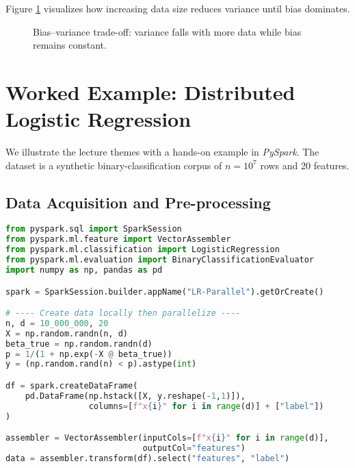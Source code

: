 \documentclass[11pt]{article}
\begin{document}
Figure \ref{fig:biasvariance} visualizes how increasing data size reduces variance until bias dominates.

\begin{figure}[h]
  \centering
  \caption{Bias–variance trade-off: variance falls with more data while bias remains constant.}
  \label{fig:biasvariance}
\end{figure}

\section{Worked Example: Distributed Logistic Regression}

We illustrate the lecture themes with a hands-on example in \emph{PySpark}.  
The dataset is a synthetic binary-classification corpus of $n=10^{7}$ rows and 20 features.

\subsection{Data Acquisition and Pre-processing}

\begin{lstlisting}[language=Python,caption={Generate and load a large synthetic dataset.}]
from pyspark.sql import SparkSession
from pyspark.ml.feature import VectorAssembler
from pyspark.ml.classification import LogisticRegression
from pyspark.ml.evaluation import BinaryClassificationEvaluator
import numpy as np, pandas as pd

spark = SparkSession.builder.appName("LR-Parallel").getOrCreate()

# ---- Create data locally then parallelize ----
n, d = 10_000_000, 20
X = np.random.randn(n, d)
beta_true = np.random.randn(d)
p = 1/(1 + np.exp(-X @ beta_true))
y = (np.random.rand(n) < p).astype(int)

df = spark.createDataFrame(
    pd.DataFrame(np.hstack([X, y.reshape(-1,1)]),
                 columns=[f"x{i}" for i in range(d)] + ["label"])
)

assembler = VectorAssembler(inputCols=[f"x{i}" for i in range(d)],
                            outputCol="features")
data = assembler.transform(df).select("features", "label")
\end{lstlisting}
\end{document}
